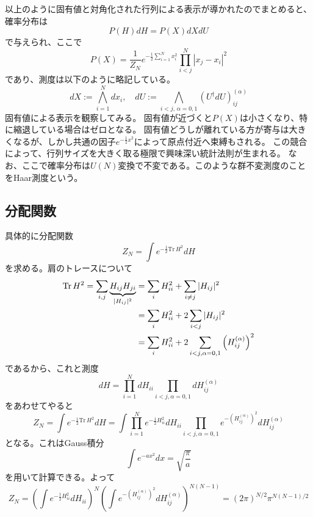 \documentclass[10pt]{jsreport}
\theoremstyle{definition}%
\newcommand{\kakko}[1]{\left(#1 \right)} %
\newcommand{\Tr}{\mathrm{Tr\,}}
\numberwithin{equation}{section}%
\begin{document}
以上のように固有値と対角化された行列による表示が導かれたのでまとめると、確率分布は
\begin{equation}
  P(H)dH=P(X)dXdU
\end{equation}
で与えられ、ここで
\begin{equation}
  P(X)=\frac{1}{Z_{N}}e^{-\frac{1}{2}\sum_{i=1}^{N}x_{i}^{2}}\prod_{i<j}^{N}|x_{j}-x_{i}|^{2}
\end{equation}
であり、測度は以下のように略記している。
\begin{equation}
  dX:=\bigwedge_{i=1}^{N}dx_{i}, \quad dU:=\bigwedge_{i<j , \, \alpha=0,1}(U^{\dagger}dU)_{ij}^{(\alpha)}
\end{equation}
固有値による表示を観察してみる。
固有値が近づくと$P(X)$は小さくなり、特に縮退している場合はゼロとなる。
固有値どうしが離れている方が寄与は大きくなるが、しかし共通の因子$e^{-\frac{1}{2}x^{2}}$によって原点付近へ束縛もされる。
この競合によって、行列サイズを大きく取る極限で興味深い統計法則が生まれる。
なお、ここで確率分布は$U(N)$変換で不変である。このような群不変測度のことをHaar測度という。
\subsection{分配関数}
具体的に分配関数
\begin{equation}
  Z_{N}=\int e^{-\frac{1}{2}\Tr H^{2}}dH
\end{equation}
を求める。肩のトレースについて
\begin{align}
  \Tr H^{2}=\sum_{i,j} \underbrace{H_{ij}H_{ji}}_{|H_{ij}|^{2}} &= \sum_{i}H_{ii}^{2}+\sum_{i\neq j}|H_{ij}|^{2}\notag \\
  &=\sum_{i}H_{ii}^{2}+2\sum_{i<j}|H_{ij}|^{2}\notag\\
  &=\sum_{i}H_{ii}^{2}+2\sum_{i<j,\alpha=0,1}\kakko{H_{ij}^{(\alpha)}}^{2}\\
\end{align}
であるから、これと測度
\begin{equation}
  dH=\prod_{i=1}^{N}dH_{ii}\prod_{i< j,\alpha=0,1}dH_{ij}^{(\alpha)}
\end{equation}
をあわせてやると
\begin{equation}
  Z_{N}=\int e^{-\frac{1}{2}\Tr H^{2}}dH=\int \prod_{i=1}^{N}e^{-\frac{1}{2}H_{ii}^{2}}dH_{ii}\prod_{i< j,\alpha=0,1}e^{-\kakko{H_{ij}^{(\alpha)}}^{2}}dH_{ij}^{(\alpha)}
\end{equation}
となる。これはGauss積分
\begin{equation}
  \int e^{-ax^{2}}dx=\sqrt{\frac{\pi}{a}}
\end{equation}
を用いて計算できる。よって
\begin{equation}
  Z_{N}=\kakko{\int e^{-\frac{1}{2}H_{ii}^{2}}dH_{ii}}^{N} \kakko{\int e^{-\kakko{H_{ij}^{(\alpha)}}^{2}}dH_{ij}^{(\alpha)}}^{N(N-1)}=(2\pi)^{N/2}\pi^{N(N-1)/2}
\end{equation}
\end{document}
